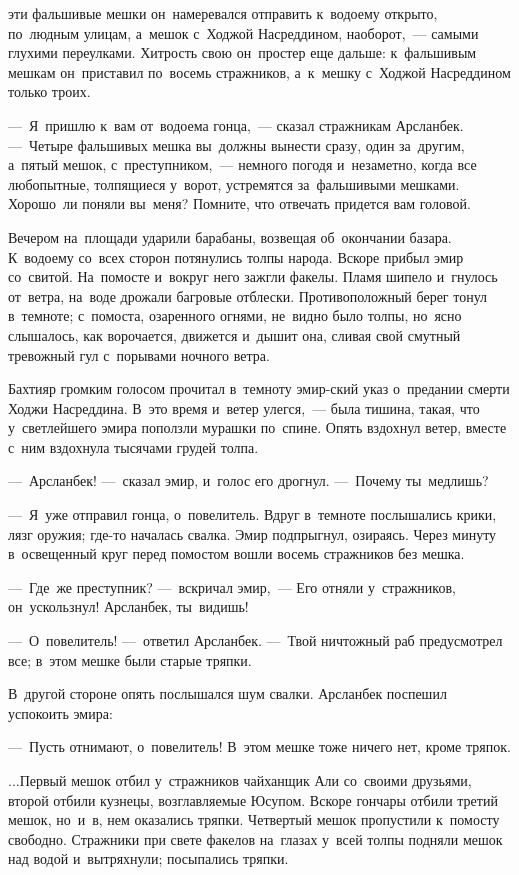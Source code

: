 \documentclass[12pt,a4paper]{book}
\begin{document}
эти фальшивые мешки он~намеревался отправить к~водоему открыто, по~людным улицам, а~мешок с~Ходжой Насреддином, наоборот,~— самыми глухими переулками. Хитрость свою он~простер еще дальше: к~фальшивым мешкам он~приставил по~восемь стражников, а~к~мешку с~Ходжой Насреддином только троих.

—~Я~пришлю к~вам от~водоема гонца,~— сказал стражникам Арсланбек. —~Четыре фальшивых мешка вы~должны вынести сразу, один за~другим, а~пятый мешок, с~преступником,~— немного погодя и~незаметно, когда все любопытные, толпящиеся у~ворот, устремятся за~фальшивыми мешками. Хорошо~ли поняли вы~меня? Помните, что отвечать придется вам головой.

Вечером на~площади ударили барабаны, возвещая об~окончании базара. К~водоему со~всех сторон потянулись толпы народа. Вскоре прибыл эмир со~свитой. На~помосте и~вокруг него зажгли факелы. Пламя шипело и~гнулось от~ветра, на~воде дрожали багровые отблески. Противоположный берег тонул в~темноте; с~помоста, озаренного огнями, не~видно было толпы, но~ясно слышалось, как ворочается, движется и~дышит она, сливая свой смутный тревожный гул с~порывами ночного ветра.

Бахтияр громким голосом прочитал в~темноту эмир-ский указ о~предании смерти Ходжи Насреддина. В~это время и~ветер улегся,~— была тишина, такая, что у~светлейшего эмира поползли мурашки по~спине. Опять вздохнул ветер, вместе с~ним вздохнула тысячами грудей толпа.

—~Арсланбек! —~сказал эмир, и~голос его дрогнул. —~Почему ты~медлишь?

—~Я~уже отправил гонца, о~повелитель. Вдруг в~темноте послышались крики, лязг оружия; где-то началась свалка. Эмир подпрыгнул, озираясь. Через минуту в~освещенный круг перед помостом вошли восемь стражников без мешка.

—~Где~же преступник? —~вскричал эмир,~— Его отняли у~стражников, он~ускользнул! Арсланбек, ты~видишь!

—~О~повелитель! —~ответил Арсланбек. —~Твой ничтожный раб предусмотрел все; в~этом мешке были старые тряпки.

В~другой стороне опять послышался шум свалки. Арсланбек поспешил успокоить эмира:

—~Пусть отнимают, о~повелитель! В~этом мешке тоже ничего нет, кроме тряпок.

...Первый мешок отбил у~стражников чайханщик Али со~своими друзьями, второй отбили кузнецы, возглавляемые Юсупом. Вскоре гончары отбили третий мешок, но~и~в, нем оказались тряпки. Четвертый мешок пропустили к~помосту свободно. Стражники при свете факелов на~глазах у~всей толпы подняли мешок над водой и~вытряхнули; посыпались тряпки.
\end{document}
